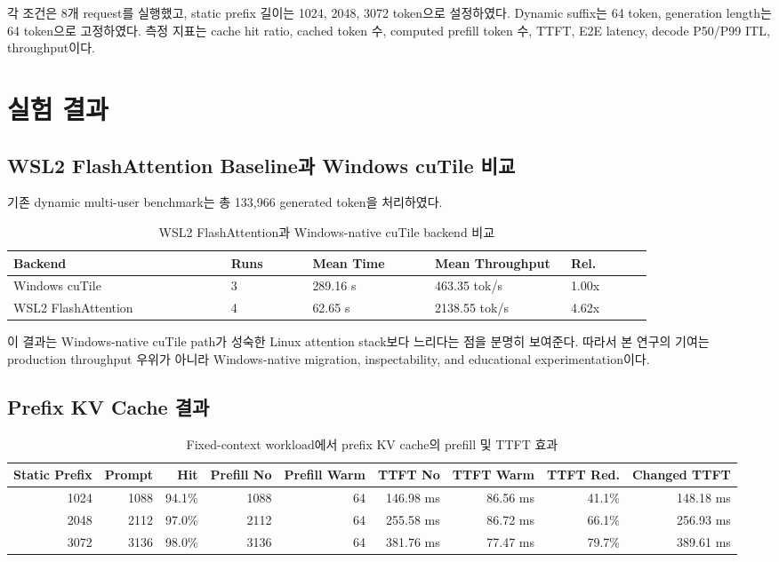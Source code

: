 \documentclass{kcc}
\begin{document}
각 조건은 8개 request를 실행했고, static prefix 길이는 1024, 2048, 3072 token으로 설정하였다. Dynamic suffix는 64 token, generation length는 64 token으로 고정하였다. 측정 지표는 cache hit ratio, cached token 수, computed prefill token 수, TTFT, E2E latency, decode P50/P99 ITL, throughput이다.

\section{실험 결과}
\subsection{WSL2 FlashAttention Baseline과 Windows cuTile 비교}
기존 dynamic multi-user benchmark는 총 133,966 generated token을 처리하였다.

\begin{table}[h]
\centering
\scriptsize
\setlength{\tabcolsep}{2pt}
\begin{tabular}{|p{0.32\linewidth}|p{0.12\linewidth}|p{0.18\linewidth}|p{0.20\linewidth}|p{0.12\linewidth}|}
\hline
\textbf{Backend} & \textbf{Runs} & \textbf{Mean Time} & \textbf{Mean Throughput} & \textbf{Rel.} \\ \hline
Windows cuTile & 3 & 289.16 s & 463.35 tok/s & 1.00x \\ \hline
WSL2 FlashAttention & 4 & 62.65 s & 2138.55 tok/s & 4.62x \\ \hline
\end{tabular}
\caption{WSL2 FlashAttention과 Windows-native cuTile backend 비교}
\end{table}

이 결과는 Windows-native cuTile path가 성숙한 Linux attention stack보다 느리다는 점을 분명히 보여준다. 따라서 본 연구의 기여는 production throughput 우위가 아니라 Windows-native migration, inspectability, and educational experimentation이다.

\subsection{Prefix KV Cache 결과}

\begin{table}[t]
\centering
\scriptsize
\setlength{\tabcolsep}{2pt}
\begin{tabular}{|r|r|r|r|r|r|r|r|r|}
\hline
\textbf{Static Prefix} & \textbf{Prompt} & \textbf{Hit} & \textbf{Prefill No} & \textbf{Prefill Warm} & \textbf{TTFT No} & \textbf{TTFT Warm} & \textbf{TTFT Red.} & \textbf{Changed TTFT} \\ \hline
1024 & 1088 & 94.1\% & 1088 & 64 & 146.98 ms & 86.56 ms & 41.1\% & 148.18 ms \\ \hline
2048 & 2112 & 97.0\% & 2112 & 64 & 255.58 ms & 86.72 ms & 66.1\% & 256.93 ms \\ \hline
3072 & 3136 & 98.0\% & 3136 & 64 & 381.76 ms & 77.47 ms & 79.7\% & 389.61 ms \\ \hline
\end{tabular}
\caption{Fixed-context workload에서 prefix KV cache의 prefill 및 TTFT 효과}
\end{table}
\end{document}
